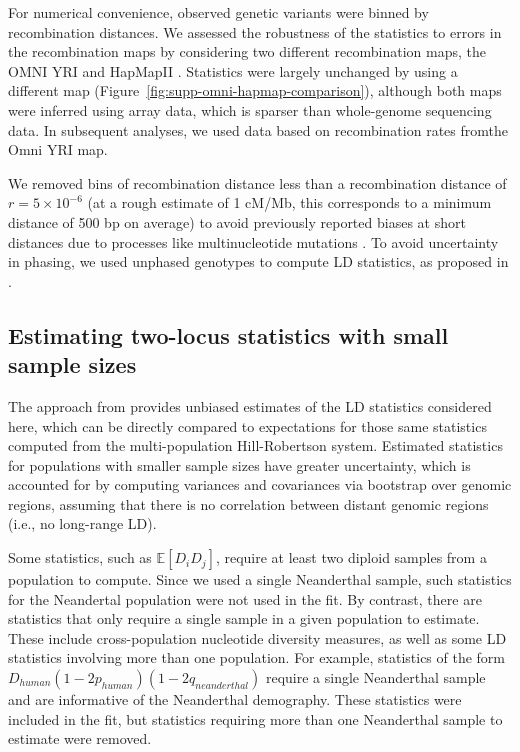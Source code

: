 \documentclass[]{article}
\newcommand{\E}{\mathbb{E}}
\begin{document}
For numerical convenience, observed genetic variants were binned by
recombination distances. We assessed the robustness of the statistics to errors
in the recombination maps by considering two different recombination maps, the
OMNI YRI and HapMapII
\citep{1000_Genomes_Project_Consortium2015-zq,International_HapMap_Consortium2007-vn}.
Statistics were largely unchanged by using a different map
(Figure~\ref{fig:supp-omni-hapmap-comparison}), although both maps were
inferred using array data, which is sparser than whole-genome sequencing data.
In subsequent analyses, we used data based on recombination rates fromthe Omni YRI map.

We removed bins of recombination distance less than a recombination distance of
$r = 5\times10^{-6}$ (at a rough estimate of 1 cM/Mb, this corresponds to a minimum
distance of 500 bp on average) to avoid previously reported biases at short
distances due to processes like multinucleotide mutations
\citep{Harris2014-zg,Ragsdale2019-nt}. To avoid uncertainty in phasing, we used
unphased genotypes to compute LD statistics, as proposed in
\citet{Ragsdale2020-nz}. 

\subsection{Estimating two-locus statistics with small sample sizes}

The approach from \citet{Ragsdale2020-nz} provides unbiased estimates of the LD
statistics considered here, which can be directly compared to expectations for
those same statistics computed from the multi-population Hill-Robertson system.
Estimated statistics for populations with smaller sample sizes have greater
uncertainty, which is accounted for by computing variances and covariances via
bootstrap over genomic regions, assuming that there is no correlation between
distant genomic regions (i.e., no long-range LD).

Some statistics, such as $\E[D_i D_j]$, require at least two diploid samples
from a population to compute. Since we used a single Neanderthal sample, such
statistics for the Neandertal population were not used in the fit. By contrast,
there are statistics that only require a single sample in a given population to
estimate. These include cross-population nucleotide diversity measures, as well
as some LD statistics involving more than one population. For example,
statistics of the form $D_{human}(1-2p_{human})(1-2q_{neanderthal})$ require a
single Neanderthal sample and are informative of the Neanderthal demography.
These statistics were included in the fit, but statistics requiring more than
one Neanderthal sample to estimate were removed.
\end{document}
